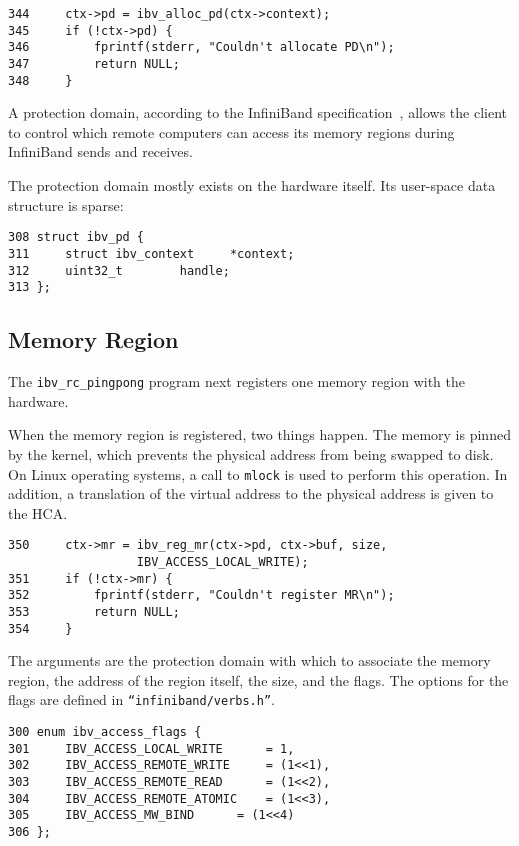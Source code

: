 \documentclass[letterpaper,12pt]{article}
\begin{document}
\lstset{language=C, caption=Opening a Protection Domain}
\begin{lstlisting}
344     ctx->pd = ibv_alloc_pd(ctx->context);
345     if (!ctx->pd) {
346         fprintf(stderr, "Couldn't allocate PD\n");
347         return NULL;
348     }
\end{lstlisting}

A protection domain, according to the InfiniBand
specification~\cite[page~107]{spec}, allows the client to control which
remote computers can access its memory regions during InfiniBand sends
and receives.

The protection domain mostly exists on the hardware itself. Its user-space
data structure is sparse:

\begin{lstlisting}
308 struct ibv_pd {
311     struct ibv_context     *context;
312     uint32_t        handle;
313 };
\end{lstlisting}

\subsection{Memory Region}
\label{sec:Memory Region}
The {\tt ibv\_rc\_pingpong} program next registers one memory region with the hardware.

When the memory region is registered, two things happen. The memory is
pinned by the kernel, which prevents the physical address from being
swapped to disk. On Linux operating systems, a call to {\tt mlock} is used
to perform this operation. In addition, a translation of the virtual address to the
physical address is given to the HCA.

\lstset{language=C, caption=Registering a Memory Region}
\begin{lstlisting}
350     ctx->mr = ibv_reg_mr(ctx->pd, ctx->buf, size,
			      IBV_ACCESS_LOCAL_WRITE);
351     if (!ctx->mr) {
352         fprintf(stderr, "Couldn't register MR\n");
353         return NULL;
354     }
\end{lstlisting}

The arguments are the protection domain with which to associate the memory region,
the address of the region itself, the size, and the flags. The options for the flags
are defined in {\tt ``infiniband/verbs.h''}.

\lstset{language=C, caption=Access Flags}
\begin{lstlisting}
300 enum ibv_access_flags {
301     IBV_ACCESS_LOCAL_WRITE      = 1,
302     IBV_ACCESS_REMOTE_WRITE     = (1<<1),
303     IBV_ACCESS_REMOTE_READ      = (1<<2),
304     IBV_ACCESS_REMOTE_ATOMIC    = (1<<3),
305     IBV_ACCESS_MW_BIND      = (1<<4)
306 };
\end{lstlisting}
\end{document}
